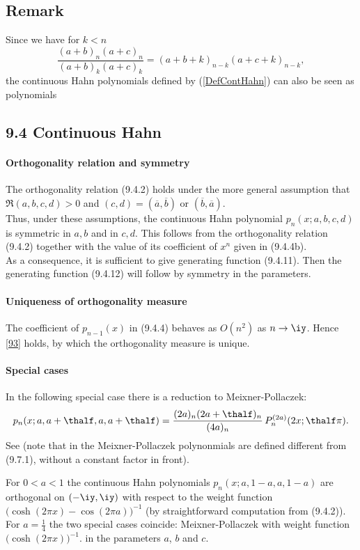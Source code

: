 \documentclass[envcountchap,graybox]{svmono}
\newcounter{rom}
\begin{document}
\subsection*{Remark}
Since we have for $k<n$
$$\frac{(a+b)_n(a+c)_n}{(a+b)_k(a+c)_k}=(a+b+k)_{n-k}(a+c+k)_{n-k},$$
the continuous Hahn polynomials defined by (\ref{DefContHahn}) can also be seen as polynomials
\subsection*{9.4 Continuous Hahn}
\label{sec9.4}
%
\paragraph{Orthogonality relation and symmetry}
The orthogonality relation (9.4.2) holds under the more general assumption that
$\Re(a,b,c,d)>0$ and $(c,d)=(\overline a,\overline b)$ or $(\overline b,\overline a)$.\\
Thus, under these assumptions, the continuous Hahn polynomial
$p_n(x;a,b,c,d)$
is symmetric in $a,b$ and in $c,d$.
This follows from the orthogonality relation (9.4.2)
together with the value of its coefficient of $x^n$ given in (9.4.4b).\\
As a consequence, it is sufficient to give generating function (9.4.11). Then the generating
function (9.4.12) will follow by symmetry in the parameters.
%
\paragraph{Uniqueness of orthogonality measure}
The coefficient of $p_{n-1}(x)$ in (9.4.4) behaves as $O(n^2)$ as $n\to\iy$.
Hence \eqref{93} holds, by which the orthogonality measure is unique.
%
\paragraph{Special cases}
In the following special case there is a reduction to
Meixner-Pollaczek:
\begin{equation}
p_n(x;a,a+\thalf,a,a+\thalf)=
\frac{(2a)_n (2a+\thalf)_n}{(4a)_n}\,P_n^{(2a)}(2x;\thalf\pi).
\end{equation}
See  (note that in  the
Meixner-Pollaczek polynonmials are defined different from (9.7.1),
without a constant factor in front).

For $0<a<1$ the continuous Hahn polynomials $p_n(x;a,1-a,a,1-a)$
are orthogonal on $(-\iy,\iy)$ with respect to the weight function
$\big(\cosh(2\pi x)-\cos(2\pi a)\big)^{-1}$
(by straightforward computation from (9.4.2)).
For $a=\tfrac14$ the two special cases coincide:
Meixner-Pollaczek with weight function $\big(\cosh(2\pi x)\big)^{-1}$.
in the parameters $a$, $b$ and $c$.
\end{document}
